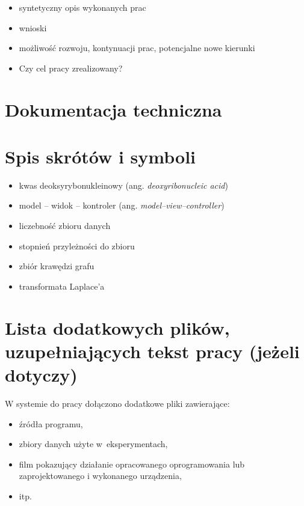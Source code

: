 \documentclass[a4paper,twoside,12pt]{book}
\newcommand{\obcy}[1]{\emph{#1}}
\newcommand{\english}[1]{{\selectlanguage{british}\obcy{#1}}}
\begin{document}
	\begin{itemize}
		\item syntetyczny opis wykonanych prac
		\item wnioski
		\item możliwość rozwoju, kontynuacji prac, potencjalne nowe kierunki
		\item Czy cel pracy zrealizowany? 
	\end{itemize}
	
	
	
	\backmatter
	
	\cleardoublepage
	\printbibliography           %
	
	\begin{appendices}
		
		\chapter{Dokumentacja techniczna}
		
		
		\chapter{Spis skrótów i symboli}
		
		\begin{itemize}
			\item[DNA] kwas deoksyrybonukleinowy (ang. \english{deoxyribonucleic acid})
			\item[MVC] model -- widok -- kontroler (ang. \english{model--view--controller}) 
			\item[$N$] liczebność zbioru danych
			\item[$\mu$] stopnień przyleżności do zbioru
			\item[$\mathbb{E}$] zbiór krawędzi grafu
			\item[$\mathcal{L}$] transformata Laplace'a 
		\end{itemize}
		
		\chapter{Lista dodatkowych plików, uzupełniających tekst pracy (jeżeli dotyczy)} 
		
		W systemie do pracy dołączono dodatkowe pliki zawierające:
		\begin{itemize}
			\item źródła programu,
			\item zbiory danych użyte w~eksperymentach,
			\item film pokazujący działanie opracowanego oprogramowania lub zaprojektowanego i wykonanego urządzenia,
			\item itp.
		\end{itemize}
		
		
		\listoffigures
		\listoftables
		
	\end{appendices}
	
	
\end{document}
